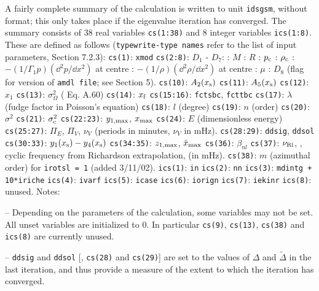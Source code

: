 A fairly complete summary of
the calculation is written to unit {\tt idsgsm},
without format; this only takes
place if the eigenvalue iteration has converged. 
The summary consists of 38 real variables {\tt cs(1:38)}
and 8 integer variables {\tt ics(1:8)}.
These are defined as follows
({\tt typewrite-type names} refer to the list of input parameters,
{\cf} Section 7.2.3):
\medskip
{\obeylines\smallskip
{\tt cs(1)}: {\tt xmod}
{\tt cs(2:8)}: $D_1$ - $D_7$:
: $M$
: $R$
: $p_{\rm c}$
: $\rho_{\rm c}$
: $- (1 /\Gamma_1 p) (\dd^2 p / \dd x^2) $ at centre
: $- (1 /\rho) (\dd^2 \rho / \dd x^2) $ at centre
: $\mu$
: $D_8$ (flag for version of {\tt amdl file}; see Section 5).
{\tt cs(10)}: $A_2 (x_{\rm s} )$
{\tt cs(11)}: $A_5 (x_{\rm s} )$
{\tt cs(12)}: $x_1$
{\tt cs(13)}: $\sigma_\Omega^2$ ({\cf} Eq. A.60)
{\tt cs(14)}: $x_{\rm f}$
{\tt cs(15:16)}: {\tt fctsbc}, {\tt fcttbc}
{\tt cs(17)}: $\lambda$ (fudge factor in Poisson's equation)
{\tt cs(18)}: $l$ (degree)
{\tt cs(19)}: $n$ (order)
{\tt cs(20)}: $\sigma^2$ 
{\tt cs(21)}: $\sigma_{\rm c}^2$
{\tt cs(22:23)}: $y_{1,\rm max}$, $x_{\rm max}$
{\tt cs(24)}: $E$ (dimensionless energy)
{\tt cs(25:27)}: $\Pi_E$, $\Pi_V$, $\nu_V$ (periods in minutes, $\nu_V$ in mHz).
{\tt cs(28:29)}: {\tt ddsig}, {\tt ddsol}
{\tt cs(30:33)}: $y_1 (x_{\rm s} ) - y_4 (x_{\rm s} )$
{\tt cs(34:35)}: $z_{1,\rm max}$, $\hat x_{\rm max}$
{\tt cs(36)}: $\beta_{nl}$
{\tt cs(37)}: $\nu_{\rm Ri}$, {\ie}, cyclic frequency from %
Richardson extrapolation, (in mHz).
{\tt cs(38)}: $m$ (azimuthal order) for {\tt irotsl = 1} (added 3/11/02).
}
\bigskip
{\obeylines
{\tt ics(1)}: {\tt in}
{\tt ics(2)}: {\tt nn}
{\tt ics(3)}: {\tt mdintg + 10*iriche}
{\tt ics(4)}: {\tt ivarf}
{\tt ics(5)}: {\tt icase}
{\tt ics(6)}: {\tt iorign}
{\tt ics(7)}: {\tt iekinr}
{\tt ics(8)}: unused.
}
\medskip\noindent
Notes:

\medskip
\item{--}
Depending on the parameters of the calculation, some variables may not be set.
All unset variables are initialized to 0. 
In particular {\tt cs(9)}, {\tt cs(13)},
{\tt cs(38)} and {\tt ics(8)} are currently unused.

\item{--}
{\tt ddsig} and {\tt ddsol} [{\ie}, {\tt cs(28)} and {\tt cs(29)}]
are set to the values of $\Delta$ and $\tilde \Delta$ in
the last iteration, and thus provide a measure of the extent to which
the iteration has converged.

